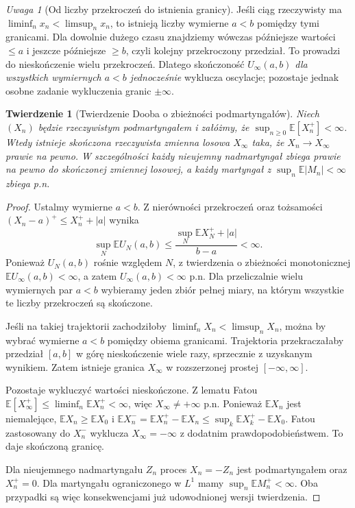 \documentclass[11pt,a4paper,oneside]{report}
\numberwithin{equation}{chapter}
\theoremstyle{plain}
\newtheorem{twierdzenie}{Twierdzenie}[chapter]
\theoremstyle{definition}
\theoremstyle{remark}
\newtheorem{uwaga}{Uwaga}[chapter]
\newcommand{\E}{\mathbb{E}}
\begin{document}
\begin{uwaga}[Od liczby przekroczeń do istnienia granicy]
Jeśli ciąg rzeczywisty ma
$\liminf_nx_n<\limsup_nx_n$, to istnieją
liczby wymierne $a<b$ pomiędzy tymi granicami.
Dla dowolnie dużego czasu znajdziemy wówczas
późniejsze wartości $\leq a$ i jeszcze późniejsze
$\geq b$, czyli kolejny przekroczony przedział.
To prowadzi do nieskończenie wielu przekroczeń.
Dlatego skończoność $U_\infty(a,b)$
\emph{dla wszystkich wymiernych $a<b$ jednocześnie}
wyklucza oscylacje; pozostaje jednak osobne
zadanie wykluczenia granic $\pm\infty$.
\end{uwaga}

\begin{twierdzenie}[Twierdzenie Dooba o zbieżności podmartyngałów]
Niech $(X_n)$ będzie rzeczywistym podmartyngałem
i załóżmy, że
$\sup_{n\geq0}\E[X_n^+]<\infty$.
Wtedy istnieje skończona rzeczywista zmienna
losowa $X_\infty$ taka, że
$X_n\to X_\infty$ prawie na pewno.
W szczególności każdy nieujemny nadmartyngał
zbiega prawie na pewno do skończonej zmiennej
losowej, a każdy martyngał z
$\sup_n\E|M_n|<\infty$ zbiega p.n.
\end{twierdzenie}
\begin{proof}
Ustalmy wymierne $a<b$. Z nierówności przekroczeń
oraz tożsamości
$(X_n-a)^+\leq X_n^++|a|$
wynika
\[
\sup_N\E U_N(a,b)
\leq\frac{\sup_N\E X_N^++|a|}{b-a}<\infty.
\]
Ponieważ $U_N(a,b)$ rośnie względem $N$,
z twierdzenia o zbieżności monotonicznej
$\E U_\infty(a,b)<\infty$, a zatem
$U_\infty(a,b)<\infty$ p.n. Dla przeliczalnie
wielu wymiernych par $a<b$ wybieramy jeden
zbiór pełnej miary, na którym wszystkie te liczby
przekroczeń są skończone.

Jeśli na takiej trajektorii zachodziłoby
$\liminf_n X_n<\limsup_n X_n$, można by
wybrać wymierne $a<b$ pomiędzy obiema granicami.
Trajektoria przekraczałaby przedział $[a,b]$
w górę nieskończenie wiele razy, sprzecznie
z uzyskanym wynikiem. Zatem istnieje granica
$X_\infty$ w rozszerzonej prostej $[-\infty,\infty]$.

Pozostaje wykluczyć wartości nieskończone.
Z lematu Fatou
$\E[X_\infty^+]\leq\liminf_n\E X_n^+<\infty$,
więc $X_\infty\ne+\infty$ p.n.
Ponieważ $\E X_n$ jest niemalejące,
$\E X_n\geq\E X_0$ i
$\E X_n^-=\E X_n^+-\E X_n
\leq\sup_k\E X_k^+-\E X_0$.
Fatou zastosowany do $X_n^-$ wyklucza
$X_\infty=-\infty$ z dodatnim prawdopodobieństwem.
To daje skończoną granicę.

Dla nieujemnego nadmartyngału $Z_n$ proces
$X_n=-Z_n$ jest podmartyngałem oraz
$X_n^+=0$. Dla martyngału ograniczonego w $L^1$
mamy $\sup_n\E M_n^+<\infty$.
Oba przypadki są więc konsekwencjami już
udowodnionej wersji twierdzenia.
\end{proof}
\end{document}
